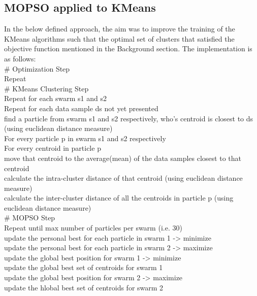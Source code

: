 \begin{flushleft}
    \subsection{MOPSO applied to KMeans}
        In the below defined approach, the aim was to improve the training of the KMeans algorithms such that the optimal 
        set of clusters that satisfied the objective function mentioned in the Background section. The implementation is 
        as follows:\\

        # Optimization Step\\
        Repeat\\
            # KMeans Clustering Step\\
            Repeat for each swarm s1 and s2 \\
                Repeat for each data sample ds not yet presented \\
                    find a particle from swarm s1 and s2 respectively, who's centroid is closest to ds (using euclidean distance measure)\\
                For every particle p in swarm s1 and s2 respectively \\
                    For every centroid in particle p \\
                        move that centroid to the average(mean) of the data samples closest to that centroid \\
                        calculate the intra-cluster distance of that centroid (using euclidean distance measure) \\
                    calculate the inter-cluster distance of all the centroids in particle p (using euclidean distance measure) \\
            # MOPSO Step \\
            Repeat until max number of particles per swarm (i.e. 30) \\
                update the personal best for each particle in swarm 1 -> minimize \\
                update the personal best for each particle in swarm 2 -> maximize \\
                update the global best position for swarm 1 -> minimize \\
                update the global best set of centroids for swarm 1 \\
                update the global best position for swarm 2 -> maximize \\
                update the hlobal best set of centroids for swarm 2 \\

\end{flushleft}
